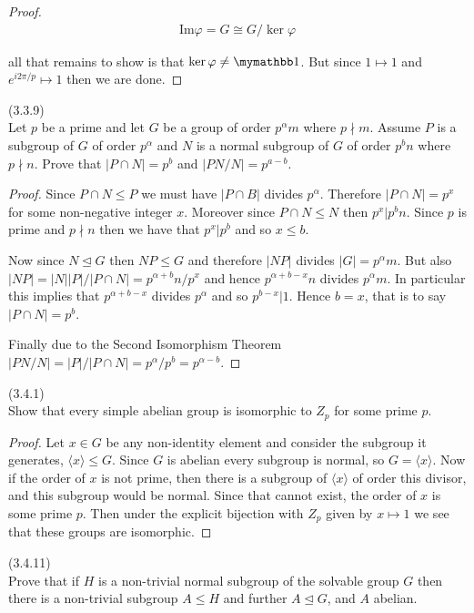 \documentclass{exam}
\begin{document}
\begin{questions}
\begin{proof}
  \begin{align*}
    \text{Im}\varphi=G\cong G/\ker\varphi
  \end{align*}

  all that remains to show is that $\ker\varphi\ne \mymathbb 1$. But since $1\mapsto 1$ and $e^{i2\pi/p}\mapsto 1$ then we are done.
  \end{proof}

\question(3.3.9)\\
Let $p$ be a prime and let $G$ be a group of order $p^\alpha m$ where $p\nmid m$.  Assume $P$ is a subgroup of $G$ of order $p^\alpha$ and $N$ is a normal subgroup of $G$ of order $p^bn$ where $p\nmid n$.  Prove that $|P\cap N|=p^b$ and $|PN/N|=p^{a-b}$.

\begin{proof}
  Since $P\cap N\leq P$ we must have $|P\cap B|$ divides $p^\alpha$.  Therefore $|P\cap N|=p^x$ for some non-negative integer $x$.  Moreover since $P\cap N \leq N$ then $p^{x}|p^{b}n$.  Since $p$ is prime and $p\nmid n$ then we have that $p^x | p^b$ and so $x \leq b$.

  Now since $N\trianglelefteq G$ then $NP \leq G$ and therefore $|NP|$ divides $|G|=p^\alpha m$.  But also $|NP|=|N||P|/|P\cap N|=p^{\alpha+b}n/p^x$ and hence $p^{\alpha+b-x}n$ divides $p^\alpha m$.  In particular this implies that $p^{\alpha+b-x}$ divides $p^\alpha$ and so $p^{b-x} | 1$.  Hence $b=x$, that is to say $|P\cap N|=p^b$.

  Finally due to the Second Isomorphism Theorem $|PN/N| = |P|/|P\cap N|=p^\alpha / p^b = p^{\alpha-b}$.
\end{proof}

\question(3.4.1)\\
Show that every simple abelian group is isomorphic to $Z_p$ for some prime $p$.

\begin{proof}
  Let $x\in G$ be any non-identity element and consider the subgroup it generates, $\langle x\rangle \leq G$.  Since $G$ is abelian every subgroup is normal, so $G = \langle x\rangle$.  Now if the order of $x$ is not prime, then there is a subgroup of $\langle x\rangle$ of order this divisor, and this subgroup would be normal.  Since that cannot exist, the order of $x$ is some prime $p$.  Then under the explicit bijection with $Z_p$ given by $x\mapsto 1$ we see that these groups are isomorphic.
\end{proof}

\question(3.4.11)\\
Prove that if $H$ is a non-trivial normal subgroup of the solvable group $G$ then there is a non-trivial subgroup $A\leq H$ and further $A\trianglelefteq G$, and $A$ abelian.


\end{questions}
\end{document}
